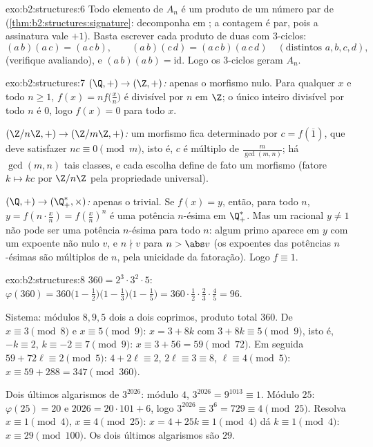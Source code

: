 \begin{solution}{exo:b2:structures:6}
Todo elemento de $A_n$ é um produto de um número par de
 (\cref{thm:b2:structures:signature}: decomponha em
; a contagem é par, pois a assinatura vale $+1$). Basta
escrever cada produto de duas  com
$3$-ciclos:
\[
(a\,b)(a\,c) = (a\,c\,b),
\qquad
(a\,b)(c\,d) = (a\,c\,b)(a\,c\,d) \quad (\text{distintos } a,b,c,d),
\]
(verifique avaliando), e $(a\,b)(a\,b) = \mathrm{id}$. Logo os
$3$-ciclos geram $A_n$.
\end{solution}

\begin{solution}{exo:b2:structures:7}
\emph{$(\Q,+) \to (\Z,+)$:} apenas o morfismo nulo. Para qualquer $x$ e
todo $n \geq 1$, $f(x) = n f\bigl(\frac xn\bigr)$ é divisível por
$n$ em $\Z$; o único inteiro divisível por todo $n$ é $0$, logo
$f(x) = 0$ para todo $x$.

\emph{$(\Z/n\Z, +) \to (\Z/m\Z, +)$:} um morfismo fica determinado por
$c = f(\overline 1)$, que deve satisfazer $n c \equiv 0 \pmod m$,
isto é, $c$ é múltiplo de $\frac{m}{\gcd(m,n)}$; há
$\gcd(m,n)$ tais classes, e cada escolha define de fato um morfismo
(fatore $k \mapsto kc$ por $\Z/n\Z$ pela propriedade universal).

\emph{$(\Q, +) \to (\Q_+^*, \times)$:} apenas o trivial. Se
$f(x) = y$, então, para todo $n$, $y = f(n \cdot \frac xn) =
f(\frac xn)^n$ é uma potência $n$-ésima em $\Q_+^*$. Mas um racional
$y \neq 1$ não pode ser uma potência $n$-ésima para todo $n$: algum primo aparece
em $y$ com um expoente não nulo $v$, e $n \nmid v$ para $n > \abs
v$ (os expoentes das potências $n$-ésimas são múltiplos de $n$, pela unicidade da
fatoração). Logo $f \equiv 1$.
\end{solution}

\begin{solution}{exo:b2:structures:8}
$360 = 2^3 \cdot 3^2 \cdot 5$:
$\varphi(360) = 360\bigl(1 - \tfrac12\bigr)\bigl(1 -
\tfrac13\bigr)\bigl(1 - \tfrac15\bigr) = 360 \cdot \tfrac12 \cdot
\tfrac23 \cdot \tfrac45 = 96$.

Sistema: módulos $8, 9, 5$ dois a dois coprimos, produto total $360$. De $x
\equiv 3 \pmod 8$ e $x \equiv 5 \pmod 9$: $x = 3 + 8k$ com $3 +
8k \equiv 5 \pmod 9$, isto é, $-k \equiv 2$, $k \equiv -2 \equiv 7
\pmod 9$: $x \equiv 3 + 56 = 59 \pmod{72}$. Em seguida $59 + 72\ell \equiv
2 \pmod 5$: $4 + 2\ell \equiv 2$, $2\ell \equiv 3 \equiv 8$, $\ell
\equiv 4 \pmod 5$: $x \equiv 59 + 288 = 347 \pmod{360}$.

Dois últimos algarismos de $3^{2026}$: módulo $4$, $3^{2026} = 9^{1013} \equiv
1$. Módulo $25$: $\varphi(25) = 20$ e $2026 = 20\cdot101 + 6$, logo
$3^{2026} \equiv 3^6 = 729 \equiv 4 \pmod{25}$. Resolva $x \equiv 1
\pmod 4$, $x \equiv 4 \pmod{25}$: $x = 4 + 25k \equiv 1 \pmod 4$
dá $k \equiv 1 \pmod 4$: $x \equiv 29 \pmod{100}$. Os dois últimos
algarismos são $29$.
\end{solution}


